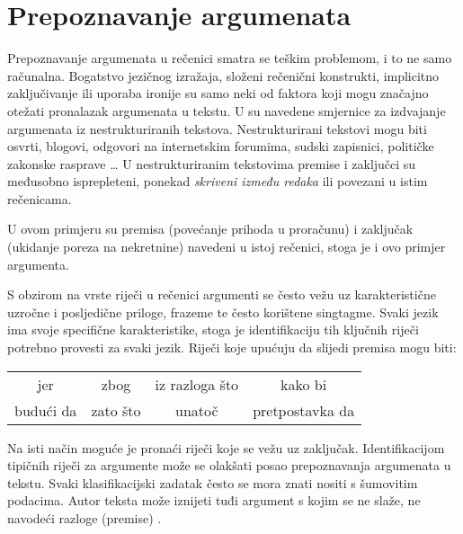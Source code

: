 \section{Prepoznavanje argumenata}

Prepoznavanje argumenata u rečenici smatra se teškim problemom, i to ne samo računalna. Bogatstvo jezičnog izražaja, složeni rečenični konstrukti, implicitno zaključivanje ili uporaba ironije su samo neki od faktora koji mogu značajno otežati pronalazak argumenata u tekstu. U \citep{harrellcreating} su navedene smjernice za izdvajanje argumenata iz nestrukturiranih tekstova. Nestrukturirani tekstovi mogu biti osvrti, blogovi, odgovori na internetskim forumima, sudski zapisnici, političke zakonske rasprave \dots
U nestrukturiranim tekstovima premise i zaključci su međusobno isprepleteni, ponekad \emph{skriveni između redaka} ili povezani u istim rečenicama. 
\vspace{1 mm}

\vspace{2 mm}

U ovom primjeru su premisa (povećanje prihoda u proračunu) i zaključak (ukidanje poreza na nekretnine) navedeni u istoj rečenici, stoga je i ovo primjer argumenta.

S obzirom na vrste riječi u rečenici argumenti se često vežu uz karakteristične uzročne i posljedične priloge, frazeme te često korištene singtagme. Svaki jezik ima svoje specifične karakteristike, stoga je identifikaciju tih ključnih riječi potrebno provesti za svaki jezik. Riječi koje upućuju da slijedi premisa mogu biti:
\begin{center}
\begin{tabular}{c c c c}
jer & zbog & iz razloga što & kako bi  \\
budući da & zato što & unatoč & pretpostavka da
\end{tabular}
\end{center}

Na isti način moguće je pronaći riječi koje se vežu uz zaključak. Identifikacijom tipičnih riječi za argumente može se olakšati posao prepoznavanja argumenata u tekstu. 
Svaki klasifikacijski zadatak često se mora znati nositi s šumovitim podacima. 
Autor teksta može iznijeti tuđi argument s kojim se ne slaže, ne navodeći razloge (premise) .

